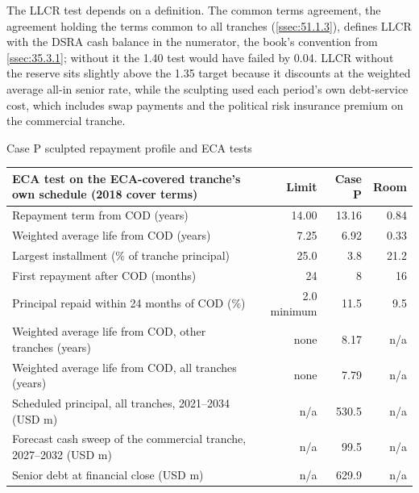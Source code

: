 The LLCR test depends on a definition. The common terms agreement, the agreement holding the terms common to all tranches (\cref{ssec:51.1.3}), defines LLCR with the DSRA cash balance in the numerator, the book's convention from \cref{ssec:35.3.1}; without it the 1.40\x{} test would have failed by 0.04\x. LLCR without the reserve sits slightly above the 1.35\x{} target because it discounts at the weighted average all-in senior rate, while the sculpting used each period's own debt-service cost, which includes swap payments and the political risk insurance premium on the commercial tranche.

\begin{exhibit}[H]
\caption{Case P sculpted repayment profile and ECA tests \casep}\label{exh:36.13}
\small
\begin{tabularx}{\linewidth}{@{}L rrr@{}}
\toprule
ECA test on the ECA-covered tranche's own schedule (2018 cover terms) & Limit & Case P & Room\\
\midrule
Repayment term from COD (years) & 14.00 & 13.16 & 0.84\\
Weighted average life from COD (years) & 7.25 & 6.92 & 0.33\\
Largest installment (\% of tranche principal) & 25.0 & 3.8 & 21.2\\
First repayment after COD (months) & 24 & 8 & 16\\
Principal repaid within 24 months of COD (\%) & 2.0 minimum & 11.5 & 9.5\\
\midrule
Weighted average life from COD, other tranches (years) & none & 8.17 & n/a\\
Weighted average life from COD, all tranches (years) & none & 7.79 & n/a\\
\midrule
Scheduled principal, all tranches, 2021--2034 (USD m) & n/a & 530.5 & n/a\\
Forecast cash sweep of the commercial tranche, 2027--2032 (USD m) & n/a & 99.5 & n/a\\
Senior debt at financial close (USD m) & n/a & 629.9 & n/a\\
\bottomrule
\end{tabularx}
\end{exhibit}

